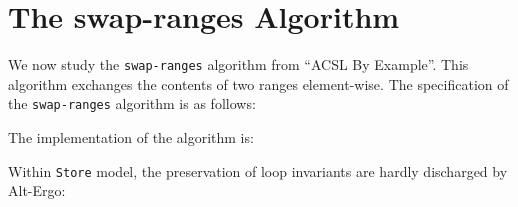 \clearpage
\section{The \textsf{swap-ranges} Algorithm}
\label{swap-ranges}

We now study the \texttt{swap-ranges} algorithm from ``ACSL By Example''.
This algorithm exchanges the contents of two ranges element-wise.
The specification of the \texttt{swap-ranges} algorithm is as follows:


The implementation of the algorithm is:


Within \texttt{Store} model, the preservation of loop invariants are
hardly discharged by \textsf{Alt-Ergo}:


